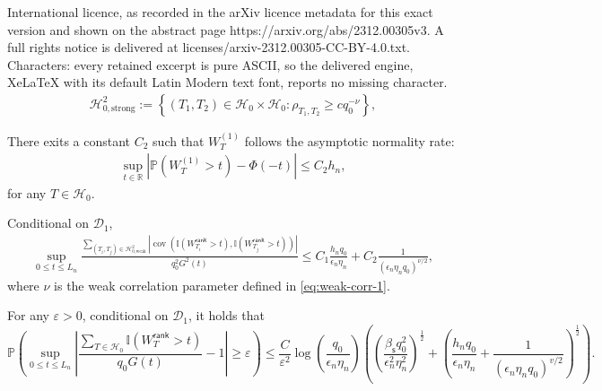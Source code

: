\documentclass[10pt,a4paper]{amsart}
\newcommand{\PP}{\mathbb{P}}
\newcommand{\R}{\mathbb{R}}
\newcommand{\abs}[1]{\left\lvert#1\right\rvert}
\newcommand{\bbI}{\mathbb{I}}
\newcommand{\cD}{\mathcal{D}}
\newcommand{\cH}{\mathcal{H}}
\begin{document}
International licence, as recorded in the arXiv licence metadata for this exact version and shown on the abstract page https://arxiv.org/abs/2312.00305v3. A full rights notice is delivered at licenses/arxiv-2312.00305-CC-BY-4.0.txt. Characters: every retained excerpt is pure ASCII, so the delivered engine, XeLaTeX with its default Latin Modern text font, reports no missing character.
\begin{equation}\label{eq:weak-corr-1}
	\begin{aligned}
		\cH_{0,\text{strong} }^2 := \left\{ (T_1,T_2)\in\cH_0\times \cH_0 : \rho_{T_1,T_2}\ge c q_0^{-\nu} \right\},
	\end{aligned}
\end{equation}

\begin{Proposition}\label{prop:asy-w1}
There exits a constant $C_2$ such that $W^{(1)}_T$ follows the asymptotic normality rate:
\begin{equation}\label{eq:asy-w1}
    \begin{aligned}
    \sup_{t\in\R}\abs{\PP(W^{(1)}_T>t )-\Phi(-t)}\le C_2 h_n,
    \end{aligned}
\end{equation}
for any $T\in \cH_0$.
\end{Proposition}

\begin{Lemma}\label{lemma:weak-cov}
        Conditional on $\cD_1$, 
\begin{equation}
\begin{aligned}
          \sup_{0\le t\le L_n } \frac{\sum_{(T_i,T_j)\in \cH_{0,\text{weak} }^2 } \abs{\operatorname{cov}(\bbI(W_{T_i}^{\mathsf{rank} }>t),\bbI(W_{T_j}^{\mathsf{rank} }>t)) }}{ q_0^2 G^2(t)}\le  C_1 \frac{h_n q_0}{\epsilon_n \eta_n }+C_2 \frac{1}{ \left(\epsilon_n\eta_n q_0\right)^{\nu/2} },
\end{aligned}
\end{equation}
where $\nu$ is the weak correlation parameter defined in \eqref{eq:weak-corr-1}.
\end{Lemma}

\begin{Lemma}\label{lemma:conv-prob}
For any $\varepsilon>0$, conditional on $\cD_1$, it holds that
\begin{equation*}
   \PP\left(\sup\limits_{0\le t\le L_n}\abs{\frac{ \sum_{T\in\cH_0}\bbI(W_T^{\mathsf{rank} }>t ) }{q_0 G(t) } -1} \ge \varepsilon\right) \le \frac{C}{\varepsilon^2} \log(\frac{q_0 }{\epsilon_n \eta_n}) \left( \left(\frac{\beta_{\mathsf{s}} q_0^2 }{ \epsilon_n^2\eta_n^2}\right)^{\frac{1}{2}} + \left(\frac{h_n q_0}{\epsilon_n \eta_n}+ \frac{1}{ \left(\epsilon_n\eta_n q_0\right)^{v/2} } \right)^{\frac{1}{2}}\right) .
\end{equation*}
\end{Lemma}
\end{document}
